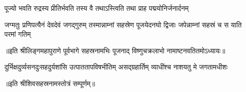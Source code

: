 \twolineshloka
{पूज्यो भवति रुद्रस्य प्रीतिर्भवति तस्य वै}
{तथाऽस्त्विति तथा प्राह पद्मयोनिर्जनार्दनम्}%

\threelineshloka
{जग्मतुः प्रणिपत्यैनं देवदेवं जगद्गुरुम्} 
{तस्मान्नाम्नां सहस्रेण पूजयेदनघो द्विजाः}
{जपेन्नाम्नां सहस्रं च स याति परमां गतिम्}%


{॥इति श्रीलिङ्गमहापुराणे पूर्वभागे सहस्रनामभिः पूजनाद् विष्णुचक्रलाभो नामाष्टनवतितमोऽध्यायः॥}%



{दुर्भिक्षदुर्व्यसनदुःसहदुर्यशांसि}
{उत्पाततापविषभीतिम् असद्‌ग्रहार्तिम्}
{व्याधींश्च नाशयतु मे जगतामधीशः}

॥इति श्रीशिवसहस्रनामस्तोत्रं सम्पूर्णम्॥
